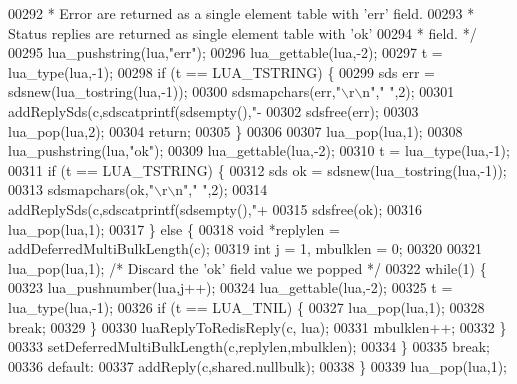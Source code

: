 \begin{DoxyCode}
{{00292 \textcolor{comment}{         * Error are returned as a single element table with 'err' field.}
00293 \textcolor{comment}{         * Status replies are returned as single element table with 'ok'}
00294 \textcolor{comment}{         * field. */}
00295         lua\_pushstring(lua,\textcolor{stringliteral}{"err"});
00296         lua\_gettable(lua,-2);
00297         t = lua\_type(lua,-1);
00298         \textcolor{keywordflow}{if} (t == LUA\_TSTRING) \{
00299             sds err = sdsnew(lua\_tostring(lua,-1));
00300             sdsmapchars(err,\textcolor{stringliteral}{"\(\backslash\)r\(\backslash\)n"},\textcolor{stringliteral}{"  "},2);
00301             addReplySds(c,sdscatprintf(sdsempty(),\textcolor{stringliteral}{"-%
00302             sdsfree(err);
00303             lua\_pop(lua,2);
00304             \textcolor{keywordflow}{return};
00305         \}
00306 
00307         lua\_pop(lua,1);
00308         lua\_pushstring(lua,\textcolor{stringliteral}{"ok"});
00309         lua\_gettable(lua,-2);
00310         t = lua\_type(lua,-1);
00311         \textcolor{keywordflow}{if} (t == LUA\_TSTRING) \{
00312             sds ok = sdsnew(lua\_tostring(lua,-1));
00313             sdsmapchars(ok,\textcolor{stringliteral}{"\(\backslash\)r\(\backslash\)n"},\textcolor{stringliteral}{"  "},2);
00314             addReplySds(c,sdscatprintf(sdsempty(),\textcolor{stringliteral}{"+%
00315             sdsfree(ok);
00316             lua\_pop(lua,1);
00317         \} \textcolor{keywordflow}{else} \{
00318             \textcolor{keywordtype}{void} *replylen = addDeferredMultiBulkLength(c);
00319             \textcolor{keywordtype}{int} j = 1, mbulklen = 0;
00320 
00321             lua\_pop(lua,1); \textcolor{comment}{/* Discard the 'ok' field value we popped */}
00322             \textcolor{keywordflow}{while}(1) \{
00323                 lua\_pushnumber(lua,j++);
00324                 lua\_gettable(lua,-2);
00325                 t = lua\_type(lua,-1);
00326                 \textcolor{keywordflow}{if} (t == LUA\_TNIL) \{
00327                     lua\_pop(lua,1);
00328                     \textcolor{keywordflow}{break};
00329                 \}
00330                 luaReplyToRedisReply(c, lua);
00331                 mbulklen++;
00332             \}
00333             setDeferredMultiBulkLength(c,replylen,mbulklen);
00334         \}
00335         \textcolor{keywordflow}{break};
00336     \textcolor{keywordflow}{default}:
00337         addReply(c,shared.nullbulk);
00338     \}
00339     lua\_pop(lua,1);
}}}}
\end{DoxyCode}

